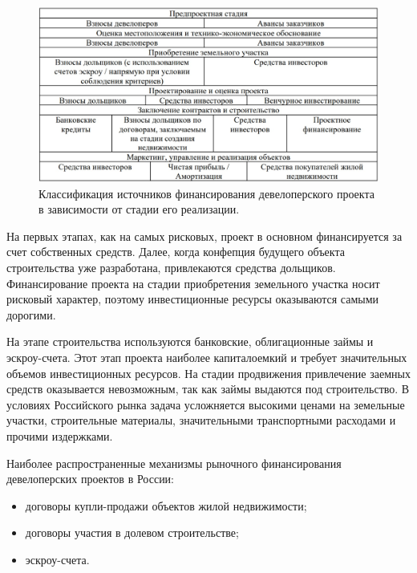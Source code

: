\documentclass[12pt,a4paper]{article} %
\begin{document}
\begin{figure}[h]
	
	\centering
	
	\includegraphics[width=0.7\linewidth]{fin_source_clas.jpg}
	
	\caption{Классификация источников финансирования девелоперского проекта в зависимости от стадии его реализации.}
	
	\label{fig:fin_source_clas}
	
\end{figure}

На первых этапах, как на самых рисковых, проект в основном финансируется за счет собственных средств. Далее, когда конфепция будущего объекта строительства уже разработана, привлекаются средства дольщиков. Финансирование проекта на стадии приобретения земельного участка носит рисковый характер, поэтому инвестиционные ресурсы оказываются самыми дорогими.

На этапе строительства используются банковские, облигационные займы и эскроу-счета. Этот этап проекта наиболее капиталоемкий  и требует значительных объемов инвестиционных ресурсов. На стадии продвижения привлечение заемных средств оказывается невозможным, так как займы выдаются под строительство.
В условиях Российского рынка задача усложняется высокими ценами на земельные участки, строительные материалы, значительными транспортными расходами и прочими издержками.

Наиболее распространенные механизмы рыночного финансирования девелоперских проектов в России:
\begin{itemize}
	\item договоры купли-продажи объектов жилой недвижимости;
	\item договоры участия в долевом строительстве;
	\item эскроу-счета.
\end{itemize}
\end{document}
